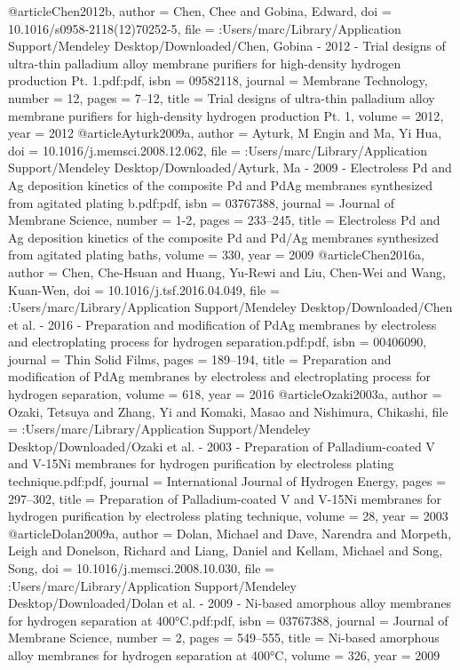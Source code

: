 @article{Chen2012b,
author = {Chen, Chee and Gobina, Edward},
doi = {10.1016/s0958-2118(12)70252-5},
file = {:Users/marc/Library/Application Support/Mendeley Desktop/Downloaded/Chen, Gobina - 2012 - Trial designs of ultra-thin palladium alloy membrane purifiers for high-density hydrogen production Pt. 1.pdf:pdf},
isbn = {09582118},
journal = {Membrane Technology},
number = {12},
pages = {7--12},
title = {{Trial designs of ultra-thin palladium alloy membrane purifiers for high-density hydrogen production Pt. 1}},
volume = {2012},
year = {2012}
}
@article{Ayturk2009a,
author = {Ayturk, M Engin and Ma, Yi Hua},
doi = {10.1016/j.memsci.2008.12.062},
file = {:Users/marc/Library/Application Support/Mendeley Desktop/Downloaded/Ayturk, Ma - 2009 - Electroless Pd and Ag deposition kinetics of the composite Pd and PdAg membranes synthesized from agitated plating b.pdf:pdf},
isbn = {03767388},
journal = {Journal of Membrane Science},
number = {1-2},
pages = {233--245},
title = {{Electroless Pd and Ag deposition kinetics of the composite Pd and Pd/Ag membranes synthesized from agitated plating baths}},
volume = {330},
year = {2009}
}
@article{Chen2016a,
author = {Chen, Che-Hsuan and Huang, Yu-Rewi and Liu, Chen-Wei and Wang, Kuan-Wen},
doi = {10.1016/j.tsf.2016.04.049},
file = {:Users/marc/Library/Application Support/Mendeley Desktop/Downloaded/Chen et al. - 2016 - Preparation and modification of PdAg membranes by electroless and electroplating process for hydrogen separation.pdf:pdf},
isbn = {00406090},
journal = {Thin Solid Films},
pages = {189--194},
title = {{Preparation and modification of PdAg membranes by electroless and electroplating process for hydrogen separation}},
volume = {618},
year = {2016}
}
@article{Ozaki2003a,
author = {Ozaki, Tetsuya and Zhang, Yi and Komaki, Masao and Nishimura, Chikashi},
file = {:Users/marc/Library/Application Support/Mendeley Desktop/Downloaded/Ozaki et al. - 2003 - Preparation of Palladium-coated V and V-15Ni membranes for hydrogen purification by electroless plating technique.pdf:pdf},
journal = {International Journal of Hydrogen Energy},
pages = {297--302},
title = {{Preparation of Palladium-coated V and V-15Ni membranes for hydrogen purification by electroless plating technique}},
volume = {28},
year = {2003}
}
@article{Dolan2009a,
author = {Dolan, Michael and Dave, Narendra and Morpeth, Leigh and Donelson, Richard and Liang, Daniel and Kellam, Michael and Song, Song},
doi = {10.1016/j.memsci.2008.10.030},
file = {:Users/marc/Library/Application Support/Mendeley Desktop/Downloaded/Dolan et al. - 2009 - Ni-based amorphous alloy membranes for hydrogen separation at 400°C.pdf:pdf},
isbn = {03767388},
journal = {Journal of Membrane Science},
number = {2},
pages = {549--555},
title = {{Ni-based amorphous alloy membranes for hydrogen separation at 400°C}},
volume = {326},
year = {2009}
}

